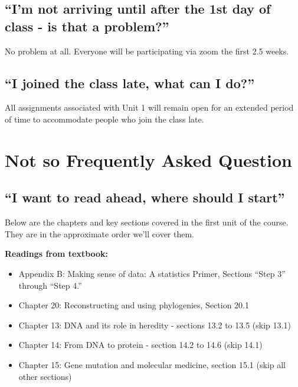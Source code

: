 \documentclass[
]{book}
\providecommand{\tightlist}{%
  \setlength{\itemsep}{0pt}\setlength{\parskip}{0pt}}
\begin{document}
\hypertarget{im-not-arriving-until-after-the-1st-day-of-class---is-that-a-problem}{%
\subsection{``I'm not arriving until after the 1st day of class - is that a problem?''}\label{im-not-arriving-until-after-the-1st-day-of-class---is-that-a-problem}}

No problem at all. Everyone will be participating via zoom the first 2.5 weeks.

\hypertarget{i-joined-the-class-late-what-can-i-do}{%
\subsection{``I joined the class late, what can I do?''}\label{i-joined-the-class-late-what-can-i-do}}

All assignments associated with Unit 1 will remain open for an extended period of time to accommodate people who join the class late.

\hypertarget{not-so-frequently-asked-question}{%
\section{Not so Frequently Asked Question}\label{not-so-frequently-asked-question}}

\hypertarget{i-want-to-read-ahead-where-should-i-start}{%
\subsection{``I want to read ahead, where should I start''}\label{i-want-to-read-ahead-where-should-i-start}}

Below are the chapters and key sections covered in the first unit of the course. They are in the approximate order we'll cover them.

\textbf{Readings from textbook:}

\begin{itemize}
\tightlist
\item
  Appendix B: Making sense of data: A statistics Primer, Sections ``Step 3'' through ``Step 4.''
\item
  Chapter 20: Reconstructing and using phylogenies, Section 20.1
\item
  Chapter 13: DNA and its role in heredity - sections 13.2 to 13.5 (skip 13.1)
\item
  Chapter 14: From DNA to protein - section 14.2 to 14.6 (skip 14.1)
\item
  Chapter 15: Gene mutation and molecular medicine, section 15.1 (skip all other sections)
\end{itemize}
\end{document}
